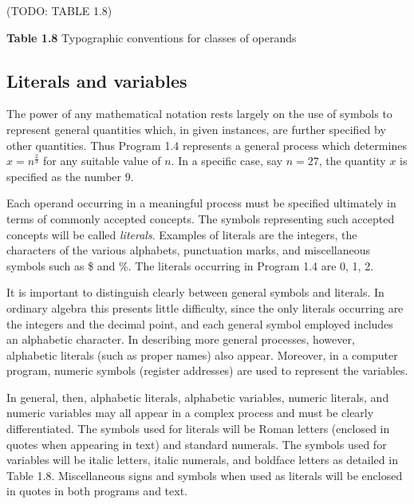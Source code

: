 \par (TODO: TABLE 1.8)

\par \textbf{Table 1.8} Typographic conventions for classes of operands

\subsection*{Literals and variables}

\par The power of any mathematical notation rests largely on the use of symbols to represent general quantities which, in given instances, are further specified by other quantities. Thus Program 1.4 represents a general process which determines $x = n^\frac{2}{3}$ for any suitable value of $n$. In a specific case, say $n = 27$, the quantity $x$ is specified as the number 9.

\par Each operand occurring in a meaningful process must be specified ultimately in terms of commonly accepted concepts. The symbols representing such accepted concepts will be called \textit{literals}. Examples of literals are the integers, the characters of the various alphabets, punctuation marks, and miscellaneous symbols such as \$ and \%. The literals occurring in Program 1.4 are 0, 1, 2.

\par It is important to distinguish clearly between general symbols and literals. In ordinary algebra this presents little difficulty, since the only literals occurring are the integers and the decimal point, and each general symbol employed includes an alphabetic character. In describing more general processes, however, alphabetic literals (such as proper names) also appear. Moreover, in a computer program, numeric symbols (register addresses) are used to represent the variables.

\par In general, then, alphabetic literals, alphabetic variables, numeric literals, and numeric variables may all appear in a complex process and must be clearly differentiated. The symbols used for literals will be Roman letters (enclosed in quotes when appearing in text) and standard numerals. The symbols used for variables will be italic letters, italic numerals, and boldface letters as detailed in Table 1.8. Miscellaneous signs and symbols when used as literals will be enclosed in quotes in both programs and text.


